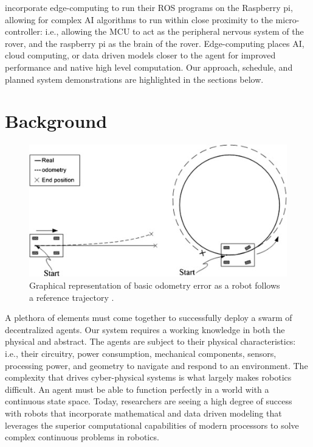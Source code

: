\documentclass[conference]{IEEEtran}
\begin{document}
incorporate edge-computing to run their ROS programs on the Raspberry pi, allowing for complex AI algorithms to run within close proximity to the micro-controller: i.e., allowing the MCU to act as the peripheral nervous system of the rover, and the raspberry pi as the brain of the rover. Edge-computing places AI, cloud computing, or data driven models closer to the agent for improved performance and native high level computation. Our approach, schedule, and planned system demonstrations are highlighted in the sections below.

\section{Background} 
\begin{figure}
	\includegraphics[width=\linewidth]{odometry_error.jpg}
	\caption{Graphical representation of basic odometry error as a robot follows a reference trajectory \cite{RN206}.}
\end{figure}
A plethora of elements must come together to successfully deploy a swarm of decentralized agents. Our system requires a working knowledge in both the physical and abstract. The agents are subject to their physical characteristics: i.e., their circuitry, power consumption, mechanical components, sensors, processing power, and geometry to navigate and respond to an environment. The complexity that drives cyber-physical systems is what largely makes robotics difficult. An agent must be able to function perfectly in a world with a continuous state space. Today, researchers are seeing a high degree of success with robots that incorporate mathematical and data driven modeling that leverages the superior computational capabilities of modern processors to solve complex continuous problems in robotics. 
\end{document}
